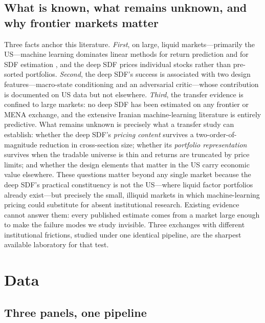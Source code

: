 \documentclass[12pt]{article}
\begin{document}
\subsection{What is known, what remains unknown, and why frontier markets matter}

Three facts anchor this literature. \emph{First}, on large, liquid markets---primarily the US---machine learning dominates linear methods for return prediction \citep{gkx2020} and for SDF estimation \citep{cpz2024}, and the deep SDF prices individual stocks rather than pre-sorted portfolios. \emph{Second}, the deep SDF's success is associated with two design features---macro-state conditioning and an adversarial critic---whose contribution is documented on US data but not elsewhere. \emph{Third}, the transfer evidence is confined to large markets: no deep SDF has been estimated on any frontier or MENA exchange, and the extensive Iranian machine-learning literature is entirely predictive. What remains unknown is precisely what a transfer study can establish: whether the deep SDF's \emph{pricing content} survives a two-order-of-magnitude reduction in cross-section size; whether its \emph{portfolio representation} survives when the tradable universe is thin and returns are truncated by price limits; and whether the design elements that matter in the US carry economic value elsewhere. These questions matter beyond any single market because the deep SDF's practical constituency is not the US---where liquid factor portfolios already exist---but precisely the small, illiquid markets in which machine-learning pricing could substitute for absent institutional research. Existing evidence cannot answer them: every published estimate comes from a market large enough to make the failure modes we study invisible. Three exchanges with different institutional frictions, studied under one identical pipeline, are the sharpest available laboratory for that test.

\section{Data}\label{sec:data}

\subsection{Three panels, one pipeline}\label{sec:coverage}
\end{document}
